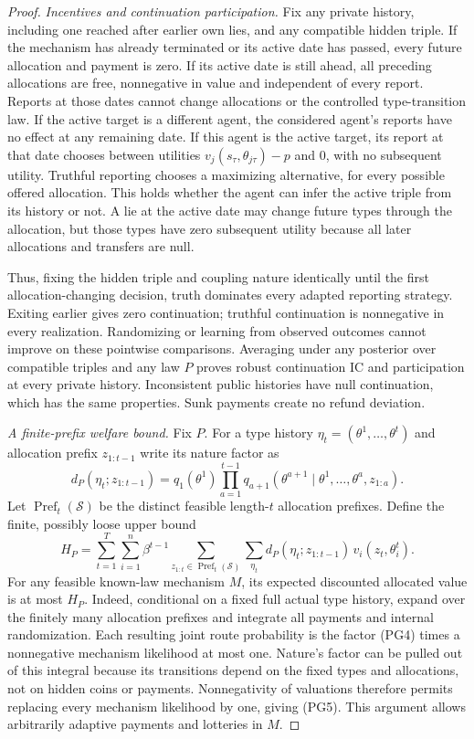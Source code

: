 \documentclass[11pt,a4paper]{article}
\begin{document}
\begin{proof}
\emph{Incentives and continuation participation.}
Fix any private history, including one reached after earlier own lies,
and any compatible hidden triple. If the mechanism has already terminated
or its active date has passed, every
future allocation and payment is zero. If its active date is still ahead,
all preceding allocations are free, nonnegative in value and independent
of every report. Reports at those dates cannot change allocations or the
controlled type-transition law. If the active target is a different agent,
the considered agent's reports have no effect at any remaining date.
If this agent is the active target, its report at that date chooses between
utilities $v_j(s_\tau,\theta_{j\tau})-p$ and $0$, with no subsequent
utility. Truthful reporting chooses a maximizing alternative, for every
possible offered allocation. This holds whether the agent can infer the
active triple from its history or not. A lie at the active date may change
future types through the allocation, but those types have zero subsequent
utility because all later allocations and transfers are null.

Thus, fixing the hidden triple and coupling nature identically until the
first allocation-changing decision, truth dominates every adapted reporting
strategy. Exiting earlier gives zero continuation; truthful continuation is
nonnegative in every realization. Randomizing or learning from observed
outcomes cannot improve on these pointwise comparisons. Averaging under
any posterior over compatible triples and any law $P$ proves robust
continuation IC and participation at every private history. Inconsistent
public histories have null continuation, which has the same properties.
Sunk payments create no refund deviation.

\emph{A finite-prefix welfare bound.}
Fix $P$. For a type history
$\eta_t=(\theta^1,\ldots,\theta^t)$ and allocation prefix
$z_{1:t-1}$ write its nature factor as
\[
 d_P(\eta_t;z_{1:t-1})
 =q_1(\theta^1)\prod_{a=1}^{t-1}
 q_{a+1}(\theta^{a+1}\mid\theta^1,\ldots,\theta^a,z_{1:a}).
 \tag{PG4}
\]
Let $\operatorname{Pref}_t(\mathcal S)$ be the distinct feasible length-$t$
allocation prefixes. Define the finite, possibly loose upper bound
\[
 H_P=\sum_{t=1}^T\sum_{i=1}^n\beta^{t-1}
 \sum_{z_{1:t}\in\operatorname{Pref}_t(\mathcal S)}
 \sum_{\eta_t}
 d_P(\eta_t;z_{1:t-1})\,v_i(z_t,\theta_i^t).
 \tag{PG5}
\]
For any feasible known-law mechanism $M$, its expected discounted allocated
value is at most $H_P$. Indeed, conditional on a fixed full actual type
history, expand over the finitely many allocation prefixes and integrate
all payments and internal randomization. Each resulting joint route
probability is the factor \textup{(PG4)} times a nonnegative mechanism
likelihood at most one. Nature's factor can be pulled out of this integral
because its transitions depend on the fixed types and allocations, not on
hidden coins or payments. Nonnegativity of valuations therefore permits
replacing every mechanism likelihood by one, giving \textup{(PG5)}.
This argument allows arbitrarily adaptive payments and lotteries in $M$.


\end{proof}
\end{document}
